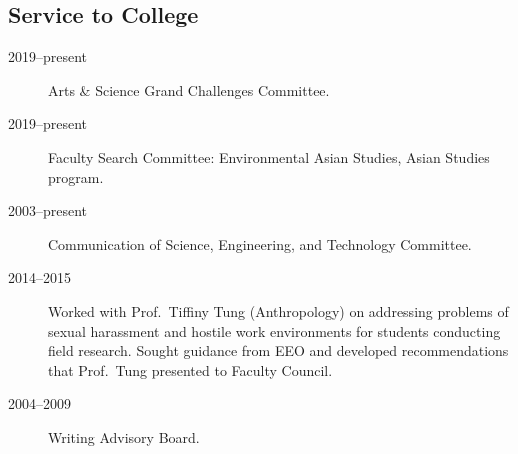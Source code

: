 \documentclass[10pt]{article}
\begin{document}
    \subsection{Service to College}
        \begin{description}
        	\item[2019--present] Arts \& Science Grand Challenges Committee.
        	\item[2019--present] Faculty Search Committee: Environmental Asian Studies, Asian Studies program.
            \item[2003--present] Communication of Science, Engineering, and Technology Committee.
            \item[2014--2015] Worked with Prof.\ Tiffiny Tung (Anthropology) on addressing problems of sexual harassment and hostile work environments for students conducting field research. Sought guidance from EEO and developed recommendations that Prof.\ Tung presented to Faculty Council.
            \item[2004--2009] Writing Advisory Board.
        \end{description}
\end{document}
